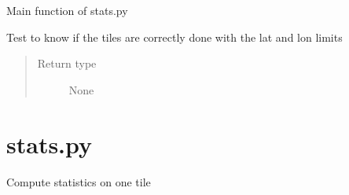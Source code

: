 \documentclass[letterpaper,10pt,english]{sphinxmanual}
\begin{document}

\begin{fulllineitems}
\label{\detokenize{pargopy:pargopy.research_tools.main}}
Main function of stats.py

\end{fulllineitems}


\begin{fulllineitems}
\label{\detokenize{pargopy:pargopy.research_tools.mbox}}
\end{fulllineitems}


\begin{fulllineitems}
\label{\detokenize{pargopy:pargopy.research_tools.plot_map}}
\end{fulllineitems}


\begin{fulllineitems}
\label{\detokenize{pargopy:pargopy.research_tools.test_tiles}}
Test to know if the tiles are correctly done with the lat and lon 
limits
\begin{quote}\begin{description}
\item[{Return type}] \leavevmode
None

\end{description}\end{quote}

\end{fulllineitems}



\section{stats.py}
\label{\detokenize{pargopy:module-pargopy.stats}}\label{\detokenize{pargopy:stats-py}}
Compute statistics on one tile
\end{document}
